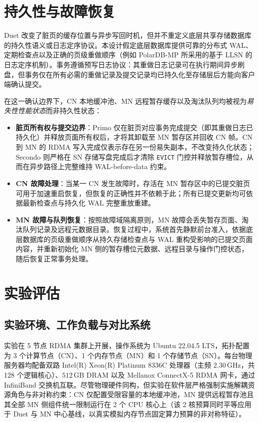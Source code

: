 \section{持久性与故障恢复\label{sec:duet.recovery}}
Duet 改变了脏页的缓存位置与异步写回时机，但并不重定义底层共享存储数据库的持久性语义或日志定序协议。本设计假定底层数据库提供可靠的分布式 WAL、定期检查点以及正确的页级重做顺序（例如 PolarDB-MP 所采用的基于 LLSN 的日志定序机制\cite{yangPolardb2024}）。事务遵循预写日志协议：其重做日志记录可在执行期间异步刷盘，但事务仅在所有必需的重做记录及提交记录均已持久化至存储层后方能向客户端确认提交\cite{grayTransaction1993}。

在这一确认边界下，CN 本地缓冲池、MN 远程暂存缓存以及淘汰队列均被视为\emph{易失性性能状态}而非持久性状态\cite{ruanPersistent2023}：
\begin{itemize}
    \item \textbf{脏页所有权与提交边界}：Primo 仅在脏页对应事务完成提交（即其重做日志已持久化）并释放页面所有权后，才将其卸载至 MN 暂存区并回收 CN 帧。CN 到 MN 的 RDMA 写入完成仅表示存在另一份易失副本，不改变持久化状态；Secondo 则严格在 SN 存储写盘完成后才清除 \texttt{EVICT} 门控并释放暂存槽位，从而在异步路径上完整维持 WAL-before-data 约束。
    \item \textbf{CN 故障处理}：当某一 CN 发生故障时，存活在 MN 暂存区中的已提交脏页可用于加速重启恢复，但恢复的正确性并不依赖于此；所有已提交更新均可依据最新检查点与持久化 WAL 完整重放重建。
    \item \textbf{MN 故障与队列恢复}：按照故障域隔离原则\cite{zhongManaging2024}，MN 故障会丢失暂存页面、淘汰队列记录及远程元数据目录。恢复过程中，系统首先静默前台准入，依据底层数据库的页级重做顺序从持久存储检查点与 WAL 重构受影响的已提交页面内容，并重新初始化 MN 侧的暂存槽位元数据、远程目录与操作门控状态，随后恢复正常事务处理。
\end{itemize}

\section{实验评估\label{sec:duet.eval}}

\subsection{实验环境、工作负载与对比系统}
实验在 5 节点 RDMA 集群上开展，操作系统为 Ubuntu 22.04.5 LTS，拓扑配置为 3 个计算节点（CN）、1 个内存节点（MN）和 1 个存储节点（SN）。每台物理服务器均配备双路 Intel(R) Xeon(R) Platinum 8336C 处理器（主频 $2.30\,\text{GHz}$，共 128 个逻辑核心）、$512\,\text{GB}$ DRAM 以及 Mellanox ConnectX-5 RDMA 网卡，通过 InfiniBand 交换机互联。尽管物理硬件同构，但实验在软件层严格强制实施解耦资源角色与非对称约束：CN 仅配置受限容量的本地缓冲池，MN 提供远程暂存池且其全部 MN 侧组件统一限制运行在 2 个 CPU 核心上（该 2 核预算同时平等应用于 Duet 与 MN 中心基线，以真实模拟内存节点固定算力预算的非对称特征）。

